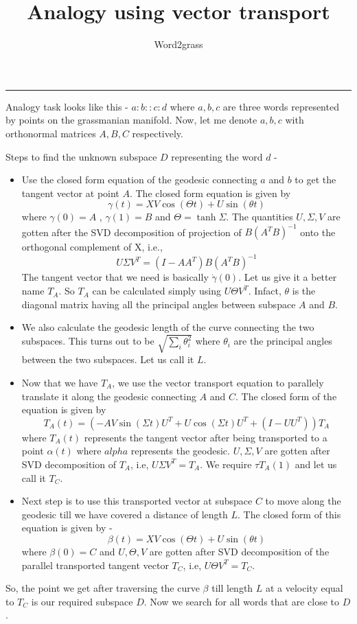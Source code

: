 \documentclass[a4paper,11pt]{article}
\title{Analogy using vector transport}
\author{Word2grass}
\begin{document}
\maketitle
\begin{center}
\rule{\textwidth}{1pt}
\end{center}

\noindent 
Analogy task looks like this - $a:b :: c:d$
where $a,b,c$ are three words represented by points on the grassmanian manifold. 
Now, let me denote $a,b,c$ with orthonormal matrices $A,B,C$ respectively.

\noindent Steps to find the unknown subspace $D$ representing the word $d$ - 

\begin{itemize}
  \item Use the closed form equation of the geodesic connecting $a$ and $b$ to get the tangent vector at point $A$. The closed form equation is given by 
  \[\gamma(t) = XV\cos(\Theta t) + U\sin(\theta t)\] where $\gamma(0)=A$ , $\gamma(1)=B$ and $\Theta = \tanh{\Sigma}$. The quantities $U,\Sigma, V$ are gotten after the SVD decomposition of projection of $B(A^TB)^{-1}$ onto the orthogonal complement of X, i.e.,
  \[U\Sigma V^T = (I - AA^T)B(A^TB)^{-1}\]
  The tangent vector that we need is basically $\dot \gamma(0)$. Let us give it a better name $T_A$. So $T_A$ can be calculated simply using $U \Theta V^T$. Infact, $\theta$ is the diagonal matrix having all the principal angles between subspace $A$ and $B$. 
  \item We also calculate the geodesic length of the curve connecting the two subspaces. This turns out to be $\sqrt{\sum_i \theta_i^{2}}$ where $\theta_i$ are the principal angles between the two subspaces. Let us call it $L$.
  \item Now that we have $T_A$, we use the vector transport equation to parallely translate it along the geodesic connecting $A$ and $C$. The closed form of the equation is given by 
  \[T_A(t) = (-AV \sin(\Sigma t)U^T + U\cos (\Sigma t)U^T + (I - UU^T))T_A \] where $T_A(t)$ represents the tangent vector after being transported to a point $\alpha(t)$ where $alpha$ represents the geodesic. $U,\Sigma, V$ are gotten after SVD decomposition of $T_A$, i.e, $U \Sigma V^T = T_A$. We require $\tau T_A(1)$ and let us call it $T_C$. 
  \item Next step is to use this transported vector at subspace $C$ to move along the geodesic till we have covered a distance of length $L$. The closed form of this equation is given by - 
  \[\beta(t) = XV\cos(\Theta t) + U\sin(\theta t) \] where $\beta(0) = C$ and $U,\Theta, V$ are gotten after SVD decomposition of the parallel transported tangent vector $T_C$, i.e, $U\Theta V^T = T_{C}$.
\end{itemize}

\noindent So, the point we get after traversing the curve $\beta$ till length $L$ at a velocity equal to $T_{C}$ is our required subspace $D$. Now we search for all words that are close to $D$.
\end{document}
